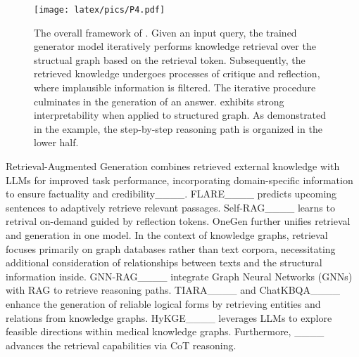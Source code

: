 
\begin{figure*}[t]
    \centering
    \texttt{[image: latex/pics/P4.pdf]}
    \caption{The overall framework of \model. Given an input query, the trained generator model \mgen iteratively performs knowledge retrieval over the structual graph based on the retrieval token. Subsequently, the retrieved knowledge undergoes processes of critique and reflection, where implausible information is filtered. The iterative procedure culminates in the generation of an answer. \model exhibits strong interpretability when applied to structured graph. As demonstrated in the example, the step-by-step reasoning path is organized in the lower half.}
    \label{fig:Self-graph}
\end{figure*}
 Retrieval-Augmented Generation combines retrieved external knowledge with LLMs for improved task performance, incorporating domain-specific information to ensure factuality and credibility____.
FLARE____ predicts upcoming sentences to adaptively retrieve relevant passages. Self-RAG____ learns to retrival on-demand guided by reflection tokens. OneGen further unifies retrieval and generation in one model. In the context of knowledge graphs, retrieval focuses primarily on graph databases rather than text corpora, necessitating additional consideration of relationships between texts and the structural information inside. GNN-RAG____ integrate Graph Neural Networks (GNNs) with RAG to retrieve reasoning paths. TIARA____ and ChatKBQA____ enhance the generation of reliable logical forms by retrieving entities and relations from knowledge graphs. HyKGE____ leverages LLMs to explore feasible directions within medical knowledge graphs. Furthermore, ____ advances the retrieval capabilities via CoT reasoning.

